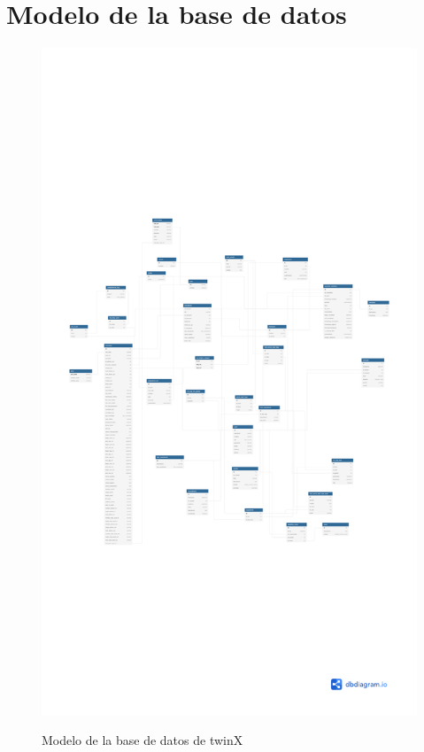 \newpage
\section{Modelo de la base de datos}

\begin{figure}[h]
	\centering
	\includegraphics[page=2,width=\textwidth,height=\textheight,trim=0 0 0 10cm, clip=true]{pdf/modelo_bd}
	\label{modeloBD}
	\caption{Modelo de la base de datos de twinX}
\end{figure}

